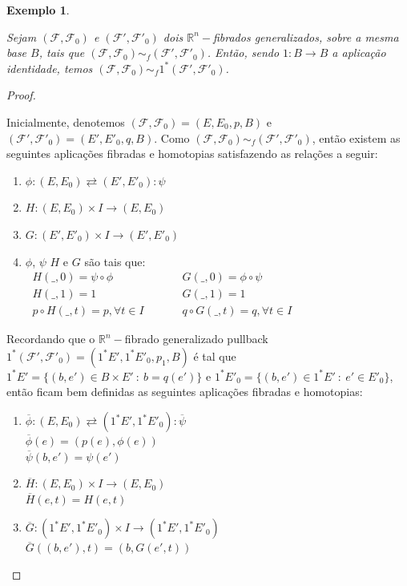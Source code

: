 \documentclass[12pt,oneside]{book} %
\newtheorem{ex}     {\hspace{0.5cm}Exemplo}[chapter]
\newcommand{\R}{\mathbb{R}}
\begin{document}
\begin{ex}\label{fht_pullback_ex1}
	\par Sejam $(\mathcal{F},\mathcal{F}_{0})$ e $(\mathcal{F'},\mathcal{F'}_{0})$ dois $\R^{n}-$fibrados generalizados, sobre a mesma base $B$, tais que $(\mathcal{F},\mathcal{F}_{0})\sim_{f} (\mathcal{F'},\mathcal{F'}_{0})$. Então, sendo $1:B\to B$ a aplicação identidade, temos $(\mathcal{F},\mathcal{F}_{0})\sim_{f} 1^{*}(\mathcal{F'},\mathcal{F'}_{0})$.
\end{ex}
\begin{proof}
	
	\
	
	\par Inicialmente, denotemos $(\mathcal{F},\mathcal{F}_{0})=(E,E_{0},p,B)$ e $(\mathcal{F'},\mathcal{F'}_{0})=(E',E'_{0},q,B)$. Como $(\mathcal{F},\mathcal{F}_{0})\sim_{f} (\mathcal{F'},\mathcal{F'}_{0})$, então existem as seguintes aplicações fibradas e homotopias satisfazendo as relações a seguir:
	
	\begin{enumerate}
		\item $\phi:(E,E_{0})\rightleftarrows (E',E'_{0}):\psi$
		\item $H:(E,E_{0})\times I\to (E,E_{0})$
		\item $G:(E',E'_{0})\times I\to (E',E'_{0})$
		\item $\phi$, $\psi$ $H$ e $G$ são tais que: $\begin{array}{lcccl}
			\ H(\_,0)=\psi\circ\phi            & & & & \ G(\_,0)=\phi\circ\psi \\
			\ H(\_,1)=1                        & & & & \ G(\_,1)=1 \\
			\ p\circ H(\_,t)=p, \forall t\in I & & & & \ q\circ G(\_,t)=q, \forall t\in I
		\end{array}$
	\end{enumerate}
	
	\par Recordando que o $\R^{n}-$fibrado generalizado pullback $1^{*}(\mathcal{F'},\mathcal{F'}_{0})=(1^{*}E',1^{*}E'_{0},p_{1},B)$ é tal que $1^{*}E'=\{ (b,e')\in B\times E' \ : \ b=q(e') \}$ e $1^{*}E'_{0}=\{ (b,e')\in 1^{*}E' \ : \ e'\in E'_{0} \}$, então ficam bem definidas as seguintes aplicações fibradas e homotopias:
	
	\begin{enumerate}
		\item $\overline{\phi}:(E,E_{0})\rightleftarrows (1^{*}E',1^{*}E'_{0}):\overline{\psi}$ \\
		$\overline{\phi}(e)=(p(e),\phi(e))$ \\
		$\overline{\psi}(b,e')=\psi(e')$
		\item $\overline{H}:(E,E_{0})\times I\to (E,E_{0})$ \\
		$\overline{H}(e,t)=H(e,t)$
		\item $\overline{G}:(1^{*}E',1^{*}E'_{0})\times I\to (1^{*}E',1^{*}E'_{0})$ \\
		$\overline{G}((b,e'),t)=(b,G(e',t))$
	\end{enumerate}
	

\end{proof}
\end{document}
